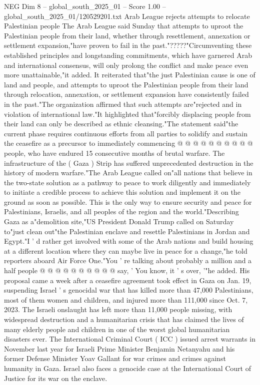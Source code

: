 \begin{textsample}{NEG Dim 8 – global\_south\_2025\_01 – Score 1.00 – global\_south\_2025\_01/120529201.txt}  \label{ex:f8_neg_140}
Arab League rejects attempts to relocate Palestinian people The Arab League said Sunday that attempts to uproot the Palestinian people from their land, whether through resettlement, annexation or settlement expansion,"have proven to fail in the past."?????"Circumventing these established principles and longstanding commitments, which have garnered Arab and international consensus, will only prolong the conflict and make peace even more unattainable,"it added.
It reiterated that"the just Palestinian cause is one of land and people, and attempts to uproot the Palestinian people from their land through relocation, annexation, or settlement expansion have consistently failed in the past."The organization affirmed that such attempts are"rejected and in violation of international law."It highlighted that"forcibly displacing people from their land can only be described as ethnic cleansing."The statement said"the current phase requires continuous efforts from all parties to solidify and sustain the ceasefire as a precursor to immediately commencing @ @ @ @ @ @ @ @ @ @ people, who have endured 15 consecutive months of brutal warfare.
The infrastructure of the ( Gaza ) Strip has suffered unprecedented destruction in the history of modern warfare."The Arab League called on"all nations that believe in the two-state solution as a pathway to peace to work diligently and immediately to initiate a credible process to achieve this solution and implement it on the ground as soon as possible.
This is the only way to ensure security and peace for Palestinians, Israelis, and all peoples of the region and the world."Describing Gaza as a"demolition site,"US President Donald Trump called on Saturday to"just clean out"the Palestinian enclave and resettle Palestinians in Jordan and Egypt."I ' d rather get involved with some of the Arab nations and build housing at a different location where they can maybe live in peace for a change,"he told reporters aboard Air Force One."You ' re talking about probably a million and a half people @ @ @ @ @ @ @ @ @ @ say, ' You know, it ' s over, '"he added.
His proposal came a week after a ceasefire agreement took effect in Gaza on Jan. 19, suspending Israel ' s genocidal war that has killed more than 47,000 Palestinians, most of them women and children, and injured more than 111,000 since Oct. 7, 2023.
The Israeli onslaught has left more than 11,000 people missing, with widespread destruction and a humanitarian crisis that has claimed the lives of many elderly people and children in one of the worst global humanitarian disasters ever.
The International Criminal Court ( ICC ) issued arrest warrants in November last year for Israeli Prime Minister Benjamin Netanyahu and his former Defense Minister Yoav Gallant for war crimes and crimes against humanity in Gaza.
Israel also faces a genocide case at the International Court of Justice for its war on the enclave.

\end{textsample}
